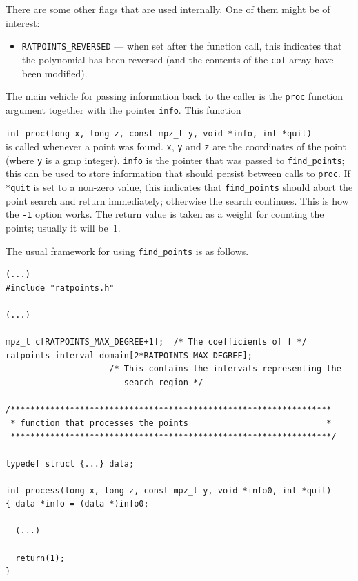 \documentclass[12pt,a4paper,oneside]{amsart}
\begin{document}
There are some other flags that are used internally. One of them might be
of interest:
\begin{itemize}
  \item \texttt{RATPOINTS\_REVERSED} --- when set after the function call,
        this indicates that the polynomial has been reversed (and the
        contents of the \texttt{cof} array have been modified).
\end{itemize}

The main vehicle for passing information back to the caller is the
\texttt{proc} function argument together with the pointer \texttt{info}.
This function \\
\strut\quad\verb+int proc(long x, long z, const mpz_t y, void *info, int *quit)+ \\
is called whenever a point was found. \texttt{x}, \texttt{y} and \texttt{z} are
the coordinates of the point (where \texttt{y} is a gmp integer).
\texttt{info} is the pointer that was passed to \texttt{find\_points}; this
can be used to store information that should persist between calls
to \texttt{proc}. If \texttt{*quit} is set to a non-zero value, this indicates
that \texttt{find\_points} should abort the point search and return immediately;
otherwise the search continues. This is how the \verb+-1+ option works.
The return value is taken as a weight
for counting the points; usually it will be~1.

The usual framework for using \texttt{find\_points} is as follows.

\begin{verbatim}
(...)
#include "ratpoints.h"

(...)

mpz_t c[RATPOINTS_MAX_DEGREE+1];  /* The coefficients of f */
ratpoints_interval domain[2*RATPOINTS_MAX_DEGREE];
                     /* This contains the intervals representing the
                        search region */

/*****************************************************************
 * function that processes the points                            *
 *****************************************************************/

typedef struct {...} data;

int process(long x, long z, const mpz_t y, void *info0, int *quit)
{ data *info = (data *)info0;

  (...)

  return(1);
}
\end{verbatim}
\end{document}
